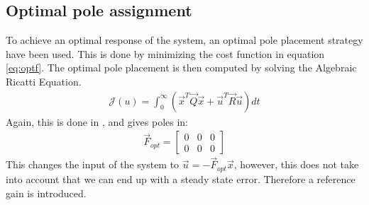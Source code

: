 \subsection{Optimal pole assignment}
To achieve an optimal response of the system, an optimal pole placement strategy have been used. This is done by minimizing the cost function in equation \vref{eq:optf}. The optimal pole placement is then computed by solving the Algebraic Ricatti Equation. 
\begin{align}
\mathcal{J}(u)=\int_{0}^{\infty} (\vec{x}^T \vec{Q} \vec{x} + \vec{u}^T \vec{R} \vec{u}) dt
\label{eq:optf}
\end{align}
Again, this is done in \MATLAB, and gives poles in:
\begin{align}
\vec{F}_{opt} = \begin{bmatrix}
0 & 0 & 0\\
0 & 0 & 0
\end{bmatrix}
\end{align}
This changes the input of the system to $\vec{u} = -\vec{F}_{opt}\vec{x}$, however, this does not take into account that we can end up with a steady state error. Therefore a reference gain is introduced. 


